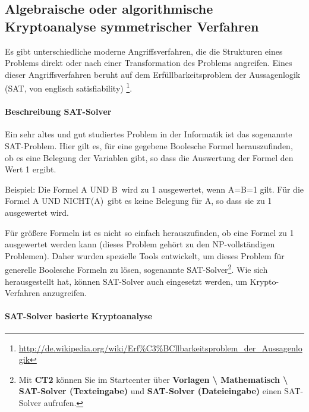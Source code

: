\begin{refsegment}
\subsection{Algebraische oder algorithmische Kryptoanalyse symmetrischer Verfahren}
\label{cm_Algebraic-versus-Symmetr}

Es gibt unterschiedliche moderne Angriffsverfahren, die die Strukturen eines Problems direkt oder nach einer Transformation des Problems angreifen. Eines dieser Angriffsverfahren beruht auf dem Erfüllbarkeitsproblem der Aussagenlogik (SAT, von englisch satisfiability)%
\footnote{%
 \url{http://de.wikipedia.org/wiki/Erf%C3%BCllbarkeitsproblem_der_Aussagenlogik}
}.


\paragraph*{Beschreibung SAT-Solver}\mbox{}
\hypertarget{ht_SAT-Solver}{}

Ein sehr altes und gut studiertes Problem in der Informatik ist das sogenannte SAT-Problem. Hier gilt es, für eine gegebene Boolesche Formel herauszufinden, ob es eine Belegung der Variablen gibt, so dass die Auswertung der Formel den Wert 1 ergibt.

Beispiel: Die Formel \glqq A UND B\grqq~wird zu 1 ausgewertet, wenn A=B=1 gilt. Für die Formel \glqq A UND NICHT(A)\grqq~gibt es keine Belegung für A, so dass sie zu 1 ausgewertet wird.

Für größere Formeln ist es nicht so einfach herauszufinden, ob eine Formel zu 1 ausgewertet werden kann (dieses Problem gehört zu den NP-vollständigen Problemen). Daher wurden spezielle Tools entwickelt, um dieses Problem für generelle Boolesche Formeln zu lösen, sogenannte SAT-Solver\footnote{
    Mit \textbf{CT2} können Sie im Startcenter
    über \textbf{Vorlagen \textbackslash{} Mathematisch \textbackslash{}
    SAT-Solver (Texteingabe)}  und  \textbf{SAT-Solver (Dateieingabe)} einen
    SAT-Solver aufrufen.
    }. Wie sich herausgestellt hat, können SAT-Solver auch eingesetzt werden, um Krypto-Verfahren
anzugreifen.


\paragraph*{SAT-Solver basierte Kryptoanalyse}\mbox{}
\hypertarget{ht_SAT-Solver_Cryptanalysis}{}


\end{refsegment}
